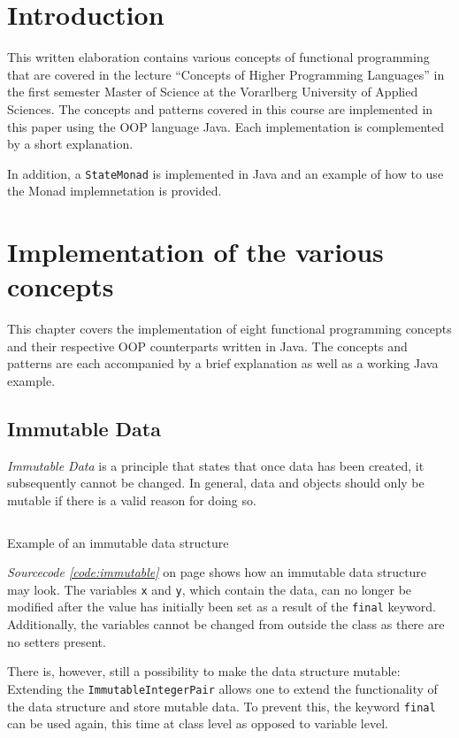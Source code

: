 \documentclass[a4paper,12pt,twoside]{scrreprt}
\begin{document}
\cleardoublepage
{}
\chapter{Introduction}
This written elaboration contains various concepts of functional programming that are covered in the lecture \enquote{Concepts of Higher Programming Languages} in the first semester Master of Science at the Vorarlberg University of Applied Sciences. The concepts and patterns covered in this course are implemented in this paper using the \ac{OOP} language Java. Each implementation is complemented by a short explanation.

In addition, a \texttt{StateMonad} is implemented in Java and an example of how to use the Monad implemnetation is provided.

\chapter{Implementation of the various concepts}
This chapter covers the implementation of eight functional programming concepts and their respective \acs{OOP} counterparts written in Java. The concepts and patterns are each accompanied by a brief explanation as well as a working Java example.

\section{Immutable Data}
\textit{Immutable Data} is a principle that states that once data has been created, it subsequently cannot be changed. In general, data and objects should only be mutable if there is a valid reason for doing so.

\begin{listing}[ht]
    \inputminted[fontsize=\footnotesize,linenos]{java}{./code/ImmutableIntegerPair.java}
    \caption[Example of an immutable data structure]{Example of an immutable data structure}
    \label{code:immutable}
\end{listing}

\textit{Sourcecode \ref{code:immutable}} on page \pageref{code:immutable} shows how an immutable data structure may look. The variables \texttt{x} and \texttt{y}, which contain the data, can no longer be modified after the value has initially been set as a result of the \texttt{final} keyword. Additionally, the variables cannot be changed from outside the class as there are no setters present.

There is, however, still a possibility to make the data structure mutable: Extending the \texttt{ImmutableIntegerPair} allows one to extend the functionality of the data structure and store mutable data. To prevent this, the keyword \texttt{final} can be used again, this time at class level as opposed to variable level.
\end{document}
